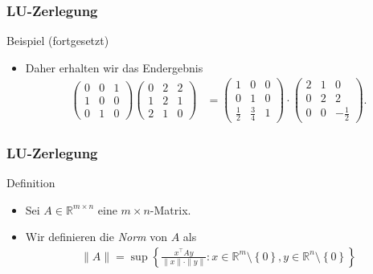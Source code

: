 \documentclass{beamer}
\renewcommand{\emph}[1]{{\textcolor{solarizedRed}{\itshape #1}}}
\newcommand\RR{\mathbb R}
\newcommand\cbc[1]{\left\{{#1}\right\}}
\newcommand{\trans}{\top}
\newcommand{\mytitle}{LU-Zerlegung}
\begin{document}
\begin{frame}\frametitle{\mytitle}
	\begin{block}{Beispiel (fortgesetzt)}
		\begin{itemize}
			\item Daher erhalten wir das Endergebnis
\begin{align*}
	\begin{pmatrix} 0&0&1\\1&0&0\\0&1&0  \end{pmatrix}\begin{pmatrix} 0&2&2\\ 1&2&1\\ 2&1&0 \end{pmatrix}&=
\begin{pmatrix}1&0&0\\0&1&0\\\frac{1}{2}&\frac{3}{4}&1\end{pmatrix}\cdot\begin{pmatrix} 2&1&0\\ 0&2&2\\ 0&0&-\frac{1}{2} \end{pmatrix}.	
				\end{align*}
		\end{itemize}
	\end{block}
\end{frame}

\begin{frame}\frametitle{\mytitle}
	\begin{block}{Definition}
		\begin{itemize}
			\item Sei $A\in\RR^{m\times n}$ eine $m\times n$-Matrix.
			\item Wir definieren die \emph{Norm} von $A$ als
				\begin{align*}
					\|A\|=\sup\cbc{\frac{x^\trans Ay}{\|x\|\cdot\|y\|}:x\in\RR^m\setminus\cbc 0,y\in\RR^n\setminus\cbc0}
				\end{align*}
		\end{itemize}
	\end{block}
\end{frame}
\end{document}
